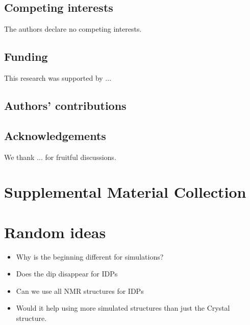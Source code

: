 \documentclass[reprint,amsmath,amssymb,rmp,onecolumn,notitlepage,11pt]{revtex4-1}
\begin{document}
\subsection{Competing interests}
The authors declare no competing interests.
\subsection{Funding}
This research was supported by ...
\subsection{Authors' contributions}

\subsection{Acknowledgements}
We thank ... for fruitful discussions.




\appendix
\section{Supplemental Material Collection}
\section{Random ideas}
\begin{itemize}
    \item Why is the beginning different for simulations?
    \item Does the dip disappear for IDPs
    \item Can we use all NMR structures for IDPs
    \item Would it help using more simulated structures than just the Crystal structure. 
\end{itemize}
\end{document}
